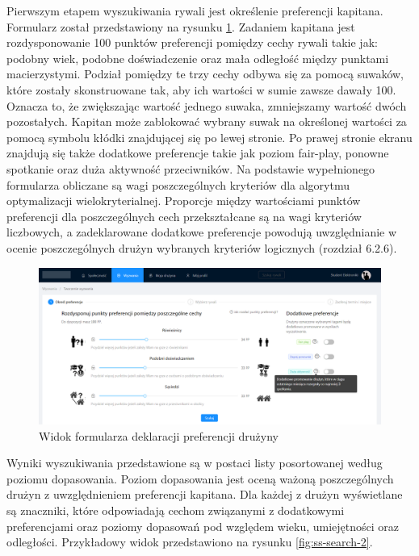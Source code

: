 Pierwszym etapem wyszukiwania rywali jest określenie preferencji kapitana. Formularz został przedstawiony na rysunku \ref{fig:ss-search-1}. Zadaniem kapitana jest rozdysponowanie 100 punktów preferencji pomiędzy cechy rywali takie jak: podobny wiek, podobne doświadczenie oraz mała odległość między punktami macierzystymi. Podział pomiędzy te trzy cechy odbywa się za pomocą suwaków, które zostały skonstruowane tak, aby ich wartości w sumie zawsze dawały 100. Oznacza to, że zwiększając wartość jednego suwaka, zmniejszamy wartość dwóch pozostałych. Kapitan może zablokować wybrany suwak na określonej wartości za pomocą symbolu kłódki znajdującej się po lewej stronie. Po prawej stronie ekranu znajdują się także dodatkowe preferencje takie jak poziom fair-play, ponowne spotkanie oraz duża aktywność przeciwników. Na podstawie wypełnionego formularza obliczane są wagi poszczególnych kryteriów dla algorytmu optymalizacji wielokryterialnej. Proporcje między wartościami punktów preferencji dla poszczególnych cech przekształcane są na wagi kryteriów liczbowych, a zadeklarowane dodatkowe preferencje powodują uwzględnianie w ocenie poszczególnych drużyn wybranych kryteriów logicznych (rozdział 6.2.6). 




\begin{figure}[H]
\centering
\includegraphics[width=\linewidth]{065-dzialanie/rys/ss-search-1.png}
\caption{Widok formularza deklaracji preferencji drużyny}
\label{fig:ss-search-1}
\end{figure}

Wyniki wyszukiwania przedstawione są w postaci listy posortowanej według poziomu dopasowania. Poziom dopasowania jest oceną ważoną poszczególnych drużyn z uwzględnieniem preferencji kapitana. Dla każdej z drużyn wyświetlane są znaczniki, które odpowiadają cechom związanymi z dodatkowymi preferencjami oraz poziomy dopasowań pod względem wieku, umiejętności oraz odległości. Przykładowy widok przedstawiono na rysunku \ref{fig:ss-search-2}.    


